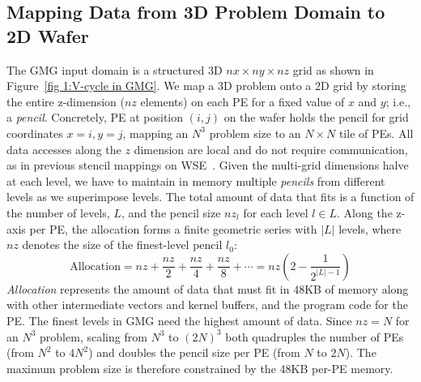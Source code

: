 \documentclass[conference]{IEEEtran}
\begin{document}
        \subsection{Mapping Data from 3D Problem Domain to 2D Wafer} \label{sec:data_layout}
            The GMG input domain is a structured 3D \(nx \times ny \times nz\) grid as shown in Figure~\ref{fig 1:V-cycle in GMG}. We map a 3D problem onto a 2D grid by storing the entire z-dimension (\(nz\) elements) on each PE for a fixed value of \(x\) and \(y\); i.e., a \textit{pencil}. Concretely, PE at position \((i,j)\) on the wafer holds the pencil for grid coordinates \(x=i, y=j\), mapping an \(N^3\) problem size to an \(N \times N\) tile of PEs. %
            All data accesses along the \(z\) dimension are local and do not require communication, as %
            in previous stencil mappings on WSE~\cite{Rocki,Sai,sai2,mathias}. Given the multi-grid dimensions halve at each level, we have to maintain in memory multiple \textit{pencils} from different levels as we superimpose levels. The total amount of data that fits is a function of the number of levels, \(L\), and the pencil size \(nz_l\) for each level \(l \in L\). Along the z-axis per PE, the allocation forms a finite geometric series with \(|L|\) levels, where \(nz\) denotes the size of the finest-level pencil \(l_0\):
            \[
            \text{Allocation} = nz + \frac{nz}{2} + \frac{nz}{4} + \frac{nz}{8} + \cdots
            = nz \left( 2 - \frac{1}{2^{|L|-1}} \right)
            \]
            \textit{Allocation} represents the amount of data that must fit in 48KB of memory along with other intermediate vectors and kernel buffers, and the program code for the PE.
            The finest levels in GMG need the highest amount of data.  %
            Since \(nz = N\) for an \(N^3\) problem, scaling from \(N^3\) to \((2N)^3\) both quadruples the number of PEs (from \(N^2\) to \(4N^2\)) and doubles the pencil size per PE (from \(N\) to \(2N\)). The maximum problem size is therefore constrained by the 48KB per-PE memory. %
\end{document}
